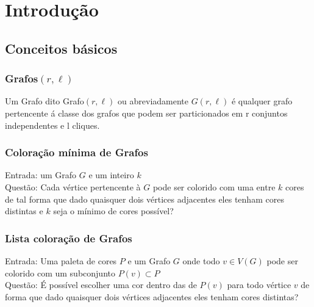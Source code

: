 \chapter{Introdução} \label{cap:intro}
\section{Conceitos básicos}
\subsection{Grafos$(r,\ell)$}
\begin{definition}
	Um Grafo dito Grafo$(r,\ell)$ ou abreviadamente $G(r,\ell)$ é qualquer grafo pertencente á classe dos grafos que podem ser particionados em r conjuntos independentes e l cliques.
\end{definition}
\subsection{Coloração mínima de Grafos}
\begin{definition}
	Entrada: um Grafo $G$ e um inteiro $k$\\
	Questão: Cada vértice pertencente à $G$ pode ser colorido com uma entre $k$ cores
	de tal forma que dado quaisquer dois vértices adjacentes eles tenham cores distintas e $k$ seja o mínimo de cores possível?
\end{definition}
\subsection{Lista coloração de Grafos}
\begin{definition}
  Entrada: Uma paleta de cores $P$ e um Grafo $G$ onde todo $v \in V(G)$ pode ser colorido com um subconjunto $P(v) \subset P$\\
  Questão: É possível escolher uma cor dentro das de $P(v)$ para todo vértice $v$ de forma que dado quaisquer dois vértices adjacentes eles tenham cores distintas?
\end{definition}

